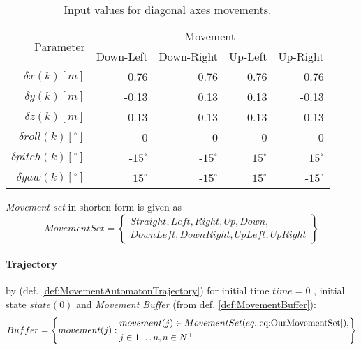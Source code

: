 \begin{table}[H]
    \centering
    \begin{tabular}{r||r|r|r|r}
    	\multirow{2}{*}{Parameter} & \multicolumn{4}{c}{Movement} \\\cline{2-5} 
                    & Down-Left & Down-Right & Up-Left  & Up-Right   \\\hline\hline
        $\delta     x(k)[m]$           & 0.76  & 0.76  & 0.76 & 0.76  \\\hline
        $\delta     y(k)[m]$           & -0.13	& 0.13	& 0.13 & -0.13 \\\hline
        $\delta     z(k)[m]$           & -0.13 & -0.13 & 0.13 & 0.13  \\\hline
        $\delta  roll(k) [^\circ]$	& 0	    & 0	    & 0    & 0     \\\hline
        $\delta pitch(k) [^\circ]$     & -$15^\circ$ & -$15^\circ$ & $15^\circ$ & $15^\circ$     \\\hline
        $\delta   yaw(k) [^\circ]$    & $15^\circ$	& -$15^\circ$	& $15^\circ$ & -$15^\circ$ \\
    \end{tabular}
    \caption{Input values for diagonal axes movements.}
    \label{tab:movements2}
\end{table}

\begin{note}
    \emph{Movement set} in shorten form is given as
    \begin{equation}\label{eq:OurMovementSet}
        Movement Set= \left\{
        \begin{gathered}
            Straight, Left,Right, Up, Down,\\
            Down Left, Down Right,  Up Left,   Up Right
        \end{gathered}
        \right\}
    \end{equation}
\end{note}

\paragraph{Trajectory} by (def. \ref{def:MovementAutomatonTrajectory}) for initial time $time = 0$ , initial state $state(0)$ and \emph{Movement Buffer} (from def. \ref{def:MovementBuffer}):
\begin{equation}\label{eq:ourBuffer}
    Buffer = \left\{
                movement(j):
                \begin{aligned}
                    &movement(j)\in Movement Set (eq. \ref{eq:OurMovementSet}),\\
                    & j \in 1\dots n, n \in N^+
                \end{aligned}
            \right\}
\end{equation}

